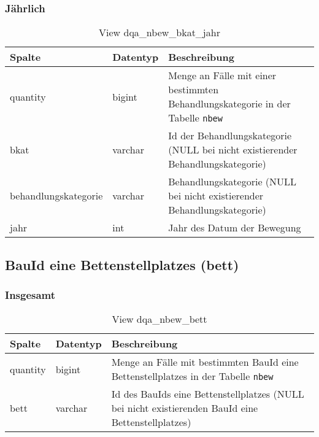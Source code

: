 \subsubsection{Jährlich} \label{subsubsec:behKatJ}

\begin{table}[ht]
	\centering   
	\caption{View dqa\_nbew\_bkat\_jahr}
	\label{tab:beweBkatJahr}
	\begin{tabular}{||l|l|p{10cm}||}   		
		\hline
		Spalte & Datentyp & Beschreibung \\ [0.5ex]
		\hline\hline
		quantity & bigint & Menge an Fälle mit einer bestimmten Behandlungskategorie in der Tabelle \texttt{nbew} \\
		\hline
		bkat & varchar & Id der Behandlungskategorie (NULL bei nicht existierender Behandlungskategorie)\\
		\hline
		behandlungskategorie & varchar & Behandlungskategorie (NULL bei nicht existierender Behandlungskategorie)\\
		\hline
		jahr & int &  Jahr des Datum der Bewegung \\
		\hline
		
	\end{tabular}
\end{table}

\newpage

\subsection{BauId eine Bettenstellplatzes (bett)} \label{subsec:bett}

\subsubsection{Insgesamt} \label{subsubsec:bettI}

\begin{table}[ht]
	\centering   
	\caption{View dqa\_nbew\_bett}
	\label{tab:beweBettAll}
	\begin{tabular}{||l|l|p{10cm}||}   		
		\hline
		Spalte & Datentyp & Beschreibung \\ [0.5ex]
		\hline\hline
		quantity & bigint & Menge an Fälle mit bestimmten BauId eine Bettenstellplatzes in der Tabelle \texttt{nbew} \\
		\hline
		bett & varchar & Id des BauIds eine Bettenstellplatzes (NULL bei nicht existierenden BauId eine Bettenstellplatzes)\\
		\hline
		
	\end{tabular}
\end{table}

